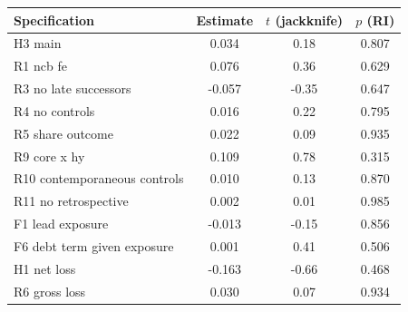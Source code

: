 \begin{tabular}{lccc}\toprule
Specification & Estimate & $t$ (jackknife) & $p$ (RI) \\\midrule
H3 main & 0.034 & 0.18 & 0.807 \\
R1 ncb fe & 0.076 & 0.36 & 0.629 \\
R3 no late successors & -0.057 & -0.35 & 0.647 \\
R4 no controls & 0.016 & 0.22 & 0.795 \\
R5 share outcome & 0.022 & 0.09 & 0.935 \\
R9 core x hy & 0.109 & 0.78 & 0.315 \\
R10 contemporaneous controls & 0.010 & 0.13 & 0.870 \\
R11 no retrospective & 0.002 & 0.01 & 0.985 \\
F1 lead exposure & -0.013 & -0.15 & 0.856 \\
F6 debt term given exposure & 0.001 & 0.41 & 0.506 \\
H1 net loss & -0.163 & -0.66 & 0.468 \\
R6 gross loss & 0.030 & 0.07 & 0.934 \\
\bottomrule\end{tabular}
